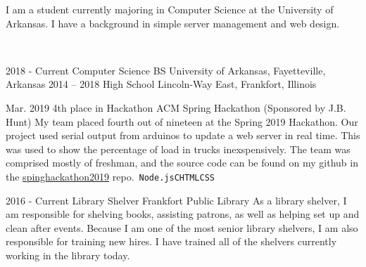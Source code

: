 \documentclass[9pt]{developercv} %
\begin{document}
	\begin{minipage}[t]{0.35\textwidth}
		\vspace{-\baselineskip} %

		I am a student currently majoring in Computer Science at the University of Arkansas. I have a background in simple server management and web design.

	\end{minipage}
	\hfill %
	\begin{minipage}[t]{0.6\textwidth} %
		\vspace{-\baselineskip} %
		\vspace{.2cm}\\
	\end{minipage}

\vspace{0.5cm}



\begin{entrylist}
	\entry
		{2018 - Current}
		{Computer Science BS}
		{}
		{University of Arkansas, Fayetteville, Arkansas}
	\entry
		{2014 -- 2018}
		{High School}
		{}
		{Lincoln-Way East, Frankfort, Illinois}
\end{entrylist}


\begin{entrylist}
	\entry
		{Mar. 2019}
		{4th place in Hackathon}
		{ACM Spring Hackathon (Sponsored by J.B. Hunt)}
		{My team placed fourth out of nineteen at the Spring 2019 Hackathon. Our project used serial output from arduinos to update a web server in real time. This was used to show the percentage of load in trucks inexspensively. The team was comprised mostly of freshman, and the source code can be found on my github in the \href{https://www.github.com/dizeeee/springhackathon2019}{spinghackathon2019} repo.\
		\newline\texttt{Node.js}\slashsep\texttt{C}\slashsep\texttt{HTML}\slashsep\texttt{CSS}}
\end{entrylist}

\begin{entrylist}
	\entry
		{2016 - Current}
		{Library Shelver}
		{Frankfort Public Library}
		{As a library shelver, I am responsible for shelving books, assisting patrons, as well as helping set up and clean after events. Because I am one of the most senior library shelvers, I am also responsible for training new hires. I have trained all of the shelvers currently working in the library today.}\
\end{entrylist}
\end{document}
